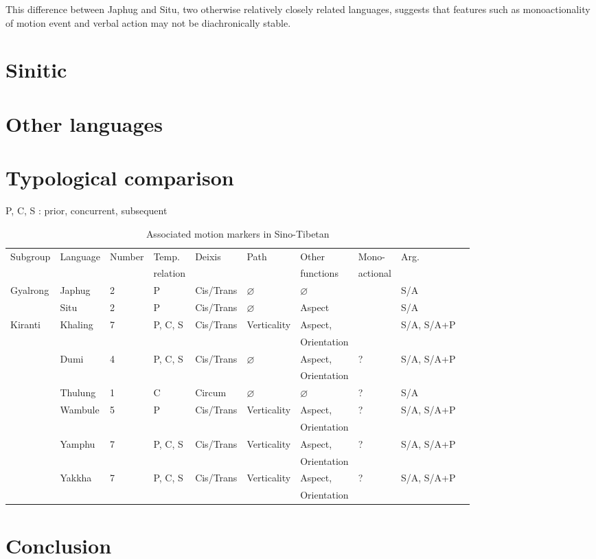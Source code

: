 \documentclass[oneside,a4paper,11pt]{article}
\newcommand{\Y}{\Checkmark}
\newcommand{\N}{\XSolidBrush}
\begin{document}
This difference between Japhug and Situ, two otherwise relatively closely related languages, suggests that features such as monoactionality of motion event and verbal action may not be diachronically stable.


\section{Sinitic}

\section{Other languages}

\section{Typological comparison}
\begin{landscape}
P, C, S : prior, concurrent, subsequent
\begin{table}[H]
\caption{Associated motion markers in Sino-Tibetan} \label{tab:am.st} \centering
\begin{tabular}{llllllllll}
\toprule
Subgroup&Language  &Number &Temp. & Deixis & Path & Other & Mono- &Arg.\\
&&&relation &&&functions& actional & \\
\midrule
Gyalrong&Japhug & 2&P & Cis/Trans & $\varnothing$ &  $\varnothing$ & \Y &S/A \\
&Situ &2&P & Cis/Trans & $\varnothing$ & Aspect&\N &S/A \\
\midrule
Kiranti &Khaling & 7&P, C, S &Cis/Trans & Verticality & Aspect,  &  \N  &S/A, S/A+P \\
&&&&&&Orientation&&\\
&Dumi & 4 &P, C, S &Cis/Trans &  $\varnothing$ & Aspect,  &  ?&S/A, S/A+P \\
  &&&&&&Orientation&&\\
&Thulung & 1 & C  &Circum &  $\varnothing$ & $\varnothing$ &?  &S/A  \\
&Wambule & 5 & P  &Cis/Trans &  Verticality & Aspect,  &?  &S/A, S/A+P \\
     &&&&&&Orientation&&\\
&Yamphu & 7 & P, C, S  & Cis/Trans &  Verticality & Aspect,  &?  &S/A, S/A+P \\
        &&&&&&Orientation&&\\
&Yakkha & 7 & P, C, S  & Cis/Trans &  Verticality & Aspect,  &?  &S/A, S/A+P \\
        &&&&&&Orientation&&\\
\bottomrule
\end{tabular}
\end{table}
\end{landscape}
\section{Conclusion}




 
\end{document}
